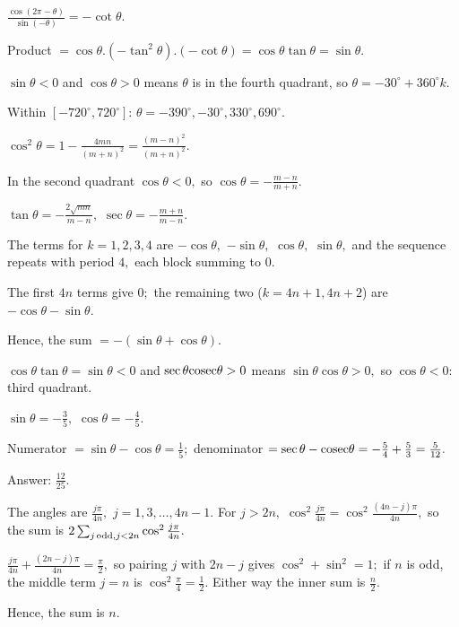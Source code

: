   $\frac{\cos(2\pi - \theta)}{\sin(-\theta)} = -\cot\theta.$

  Product $= \cos\theta.(-\tan^2\theta).(-\cot\theta) = \cos\theta\tan\theta = \sin\theta.$

\item $\sin\theta < 0$ and $\cos\theta > 0$ means $\theta$ is in the fourth quadrant, so $\theta = -30^\circ + 360^\circ k.$

  Within $[-720^\circ, 720^\circ]$: $\theta = -390^\circ, -30^\circ, 330^\circ, 690^\circ.$

\item $\cos^2\theta = 1 - \frac{4mn}{(m + n)^2} = \frac{(m - n)^2}{(m + n)^2}.$

  In the second quadrant $\cos\theta < 0,$ so $\cos\theta = -\frac{m - n}{m + n}.$

  $\tan\theta = -\frac{2\sqrt{mn}}{m - n},$ $\sec\theta = -\frac{m + n}{m - n}.$

\item The terms for $k = 1, 2, 3, 4$ are $-\cos\theta,$ $-\sin\theta,$ $\cos\theta,$ $\sin\theta,$ and the sequence repeats
  with period $4,$ each block summing to $0.$

  The first $4n$ terms give $0;$ the remaining two ($k = 4n + 1, 4n + 2$) are $-\cos\theta - \sin\theta.$

  Hence, the sum $= -(\sin\theta + \cos\theta).$

\item $\cos\theta\tan\theta = \sin\theta < 0$ and $\sec\theta{\rm cosec}\theta > 0$ means $\sin\theta\cos\theta > 0,$ so
  $\cos\theta < 0$: third quadrant.

  $\sin\theta = -\frac{3}{5},$ $\cos\theta = -\frac{4}{5}.$

  Numerator $= \sin\theta - \cos\theta = \frac{1}{5};$ denominator $= \sec\theta - {\rm cosec}\theta = -\frac{5}{4} + \frac{5}{3}
  = \frac{5}{12}.$

  Answer: $\frac{12}{25}.$

\item The angles are $\frac{j\pi}{4n},$ $j = 1, 3, \ldots, 4n - 1.$ For $j > 2n,$ $\cos^2\frac{j\pi}{4n} =
  \cos^2\frac{(4n - j)\pi}{4n},$ so the sum is $2\sum_{j \,{\rm odd}, j < 2n}\cos^2\frac{j\pi}{4n}.$

  $\frac{j\pi}{4n} + \frac{(2n - j)\pi}{4n} = \frac{\pi}{2},$ so pairing $j$ with $2n - j$ gives $\cos^2 + \sin^2 = 1;$ if $n$
  is odd, the middle term $j = n$ is $\cos^2\frac{\pi}{4} = \frac{1}{2}.$ Either way the inner sum is $\frac{n}{2}.$

  Hence, the sum is $n.$
\stopitemize
